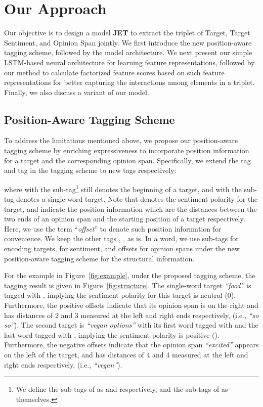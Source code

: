\documentclass[11pt,a4paper]{article}
\begin{document}
    





\section{Our Approach}
Our objective is to design a model \textbf{JET} to extract the triplet of Target, Target Sentiment, and Opinion Span jointly.
We first introduce the new position-aware tagging scheme, followed by the model architecture. We next present our simple LSTM-based neural architecture for learning feature representations, followed by our method to calculate factorized feature scores based on such feature representations for better capturing the interactions among elements in a triplet.
Finally, we also discuss a variant of our model.






\subsection{Position-Aware Tagging Scheme}


To address the limitations mentioned above, we propose our position-aware tagging scheme by enriching expressiveness to incorporate position information for a target and the corresponding opinion span.
Specifically, we extend the tag  and tag  in the  tagging scheme to new tags respectively:\setlength{\abovedisplayskip}{0pt} \setlength{\abovedisplayshortskip}{0pt}
\setlength{\belowdisplayskip}{4pt} \setlength{\belowdisplayshortskip}{4pt}

where  with the sub-tag\footnote{We define the sub-tags of  as  and  respectively, and the sub-tags of  as themselves.}  still denotes the beginning of a target, and  with the sub-tag  denotes a single-word target.
Note that  denotes the sentiment polarity for the target, and   indicate the position information which are  the distances 
between the two ends of an opinion span and the starting position of a target respectively.
Here, we use the term ``{\em offset}'' to denote such  position information for convenience.
We keep the other tags , ,  as is.
In a word, we use sub-tags  for encoding targets,  for sentiment, and offsets for opinion spans under the new position-aware tagging scheme for the structural information.


For the example in Figure~\ref{fig:example}, under the proposed tagging  scheme, the tagging result is given in Figure~\ref{fig:structure}.
The single-word target \textit{``food''} is tagged with , implying the sentiment polarity for this target is neutral (0). 
Furthermore, the positive offsets  indicate that its opinion span is on the right and has distances of 2 and 3 measured at the left and right ends respectively, (i.e., \textit{``so so''}).
The second target is \textit{``vegan options''} with its first word tagged with  and the last word tagged with , implying the sentiment polarity is positive ().
Furthermore, the negative offsets  indicate that the opinion span \textit{``excited''} appears on the left of the target, and has distances of 4 and 4 measured at the left and right ends respectively, (i.e., \textit{``vegan''}).
\end{document}
